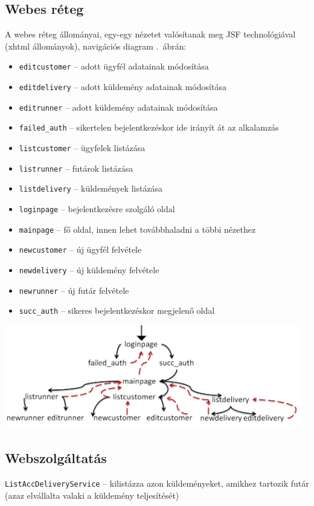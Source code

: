 \documentclass[a4paper,oneside,12pt]{article}
\begin{document}
\subsection{Webes réteg}
A webes réteg állományai, egy-egy nézetet valósítanak meg JSF technológiával
(xhtml állományok), navigációs diagram .~ábrán: 
\begin{itemize}
\item \verb+editcustomer+ -- adott ügyfél adatainak módosítása
\item \verb+editdelivery+ -- adott küldemény adatainak módosítása
\item \verb+editrunner+ -- adott küldemény adatainak módosítása
\item \verb+failed_auth+ -- sikertelen bejelentkezéskor ide irányít át az alkalamzás
\item \verb+listcustomer+ -- ügyfelek listázása
\item \verb+listrunner+ -- futárok listázása
\item \verb+listdelivery+ -- küldemények listázása
\item \verb+loginpage+ -- bejelentkezésre szolgáló oldal
\item \verb+mainpage+ -- fő oldal, innen lehet továbbhaladni a többi nézethez
\item \verb+newcustomer+ -- új ügyfél felvétele
\item \verb+newdelivery+ -- új küldemény felvétele
\item \verb+newrunner+ -- új futár felvétele
\item \verb+succ_auth+ -- sikeres bejelentkezéskor megjelenő oldal
\end{itemize}
\begin{center}
        \includegraphics[width=13cm]{nav_diag.png}
        \label{fig:nav-diag}
\end{center}

\subsection{Webszolgáltatás}
\verb+ListAccDeliveryService+ -- kilistázza azon küldeményeket, amikhez tartozik futár
(azaz elvállalta valaki a küldemény teljesítését)
\end{document}

